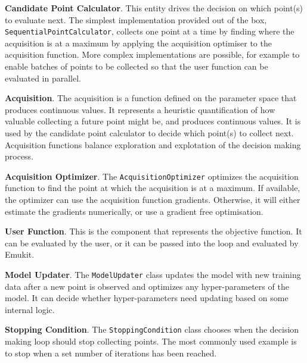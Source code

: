  

\textbf{Candidate Point Calculator}. This entity drives the decision on which point(s) to evaluate next. The simplest implementation provided out of the box, \texttt{SequentialPointCalculator}, collects one point at a time by finding where the acquisition is at a maximum by applying the acquisition optimiser to the acquisition function. More complex implementations are possible, for example to enable batches of points to be collected so that the user function can be evaluated in parallel.

\textbf{Acquisition}. The acquisition is a function defined on the parameter space that produces continuous values. It represents a heuristic quantification of how valuable collecting a future point might be, and produces continuous values. It is used by the candidate point calculator to decide which point(s) to collect next. Acquisition functions balance exploration and explotation of the decision making process.

\textbf{Acquisition Optimizer}. The \texttt{AcquisitionOptimizer} optimizes the acquisition function to find the point at which the acquisition is at a maximum. If available, the optimizer can use the acquisition function gradients. Otherwise, it will either estimate the gradients numerically, or use a gradient free optimisation.

\textbf{User Function}. This is the component that represents the objective function. It can be evaluated by the user, or it can be passed into the loop and evaluated by Emukit.

\textbf{Model Updater}. The \texttt{ModelUpdater} class updates the model with new training data after a new point is observed and optimizes any hyper-parameters of the model. It can decide whether hyper-parameters need updating based on some internal logic.

\textbf{Stopping Condition}. The \texttt{StoppingCondition} class chooses when the decision making loop should stop collecting points. The most commonly used example is to stop when a set number of iterations has been reached.


